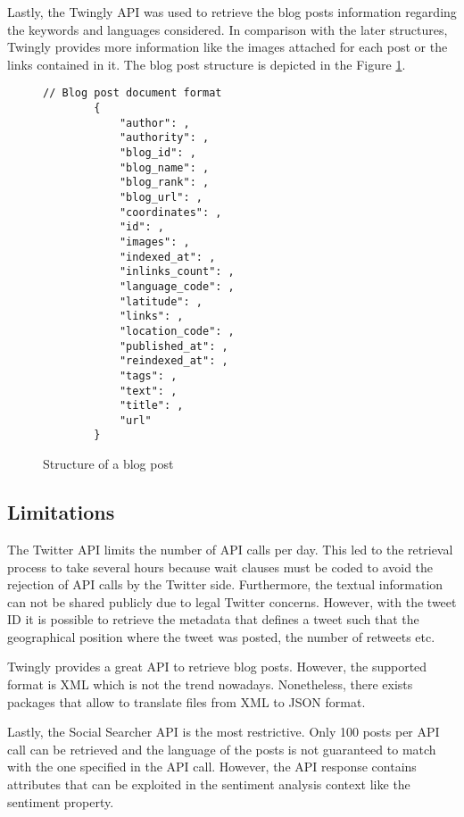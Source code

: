\par

Lastly, the Twingly API was used to retrieve the blog posts information regarding the keywords and languages considered. In comparison with the later structures, Twingly provides more information like the images attached for each post or the links contained in it. The blog post structure is depicted in the Figure \ref{fig:twinglyStructure}.
\begin{figure}[H]
	\begin{Verbatim}[xleftmargin=.5in]
		// Blog post document format
		{
			"author": ,
			"authority": ,
			"blog_id": ,
			"blog_name": ,
			"blog_rank": ,
			"blog_url": ,
			"coordinates": ,
			"id": ,
			"images": ,
			"indexed_at": ,
			"inlinks_count": ,
			"language_code": ,
			"latitude": ,
			"links": ,
			"location_code": ,
			"published_at": ,
			"reindexed_at": ,
			"tags": ,
			"text": ,
			"title": ,
			"url"
		}
	\end{Verbatim}
	\caption{Structure of a blog post}
	\label{fig:twinglyStructure}
\end{figure}
\subsection{Limitations}

The Twitter API limits the number of API calls per day. This led to the retrieval process to take several hours because wait clauses must be coded to avoid the rejection of API calls by the Twitter side. Furthermore, the textual information can not be shared publicly due to legal Twitter concerns. However, with the tweet ID it is possible to retrieve the metadata that defines a tweet such that the geographical position where the tweet was posted, the number of retweets etc. \\

\par Twingly provides a great API to retrieve blog posts. However, the supported format is XML which is not the trend nowadays. Nonetheless, there exists packages that allow to translate files from XML to JSON format.
\par Lastly, the Social Searcher API is the most restrictive. Only 100 posts per API call can be retrieved and the language of the posts is not guaranteed to match with the one specified in the API call. However, the API response contains attributes that can be exploited in the sentiment analysis context like the sentiment property.


